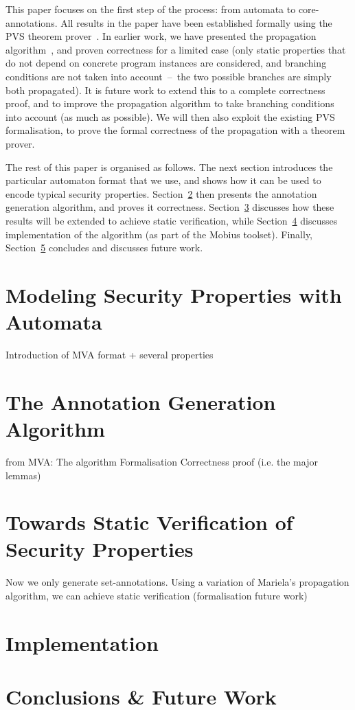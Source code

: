 \documentclass[]{llncs}
\begin{document}
This paper focuses on the first step of the process: from automata to
core-annotations. All results in the paper have been established
formally using the PVS theorem prover~\cite{Owre?}. In earlier work,
we have presented the propagation
algorithm~\cite{PavlovaBBHL04cardis}, and proven correctness for a
limited case (only static properties that do not depend on concrete
program instances are considered, and branching conditions are not
taken into account~--~the two possible branches are simply both
propagated). It is future work to extend this to a complete
correctness proof, and to improve the propagation algorithm to take
branching conditions into account (as much as possible). We will then
also exploit the existing PVS formalisation, to prove the formal
correctness of the propagation with a theorem prover.

The rest of this paper is organised as follows. The next section
introduces the particular automaton format that we use, and shows how
it can be used to encode typical security
properties. Section~\ref{SecAnnotGen} then presents the annotation
generation algorithm, and proves it
correctness. Section~\ref{SecTowardsStaticVer} discusses how these
results will be extended to achieve static verification, while
Section~\ref{SecImplem} discusses implementation of the algorithm (as
part of the \textsf{Mobius} toolset). Finally, Section~\ref{SecConcl}
concludes and discusses future work.


\section{Modeling Security Properties with Automata}\label{SecMVA}
Introduction of MVA format + several properties

\section{The Annotation Generation Algorithm}\label{SecAnnotGen}

from MVA:
The algorithm
Formalisation
Correctness proof (i.e. the major lemmas)

\section{Towards Static Verification of Security Properties}\label{SecTowardsStaticVer}
 
Now we only generate set-annotations.
Using a variation of Mariela's propagation algorithm, we can achieve static verification (formalisation future work)

\section{Implementation}\label{SecImplem}

\section{Conclusions \& Future Work }\label{SecConcl}



\end{document}
